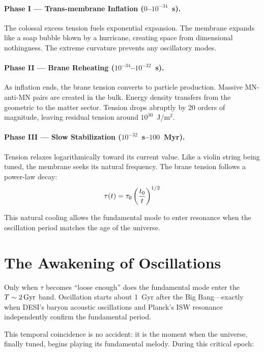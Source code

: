 \paragraph{Phase I --- Trans-membrane Inflation ($0$--$10^{-34}$~s).}
The colossal excess tension fuels exponential expansion. The membrane expands like a soap bubble blown by a hurricane, creating space from dimensional nothingness. The extreme curvature prevents any oscillatory modes.

\paragraph{Phase II --- Brane Reheating ($10^{-34}$--$10^{-32}$~s).}
As inflation ends, the brane tension converts to particle production. Massive MN-anti-MN pairs are created in the bulk. Energy density transfers from the geometric to the matter sector. Tension drops abruptly by 20 orders of magnitude, leaving residual tension around $10^{30}$~J/m$^2$.

\paragraph{Phase III --- Slow Stabilization ($10^{-32}$~s--$100$~Myr).}
Tension relaxes logarithmically toward its current value. Like a violin string being tuned, the membrane seeks its natural frequency. The brane tension follows a power-law decay:
\begin{equation}
\tau(t) = \tau_0 \left(\frac{t_0}{t}\right)^{1/2}
\end{equation}

This natural cooling allows the fundamental mode to enter resonance when the oscillation period matches the age of the universe.

\section{The Awakening of Oscillations}
\label{sec:awakening}

Only when $\tau$ becomes ``loose enough'' does the fundamental mode enter the $T \sim 2\,\text{Gyr}$ band. Oscillation starts about 1~Gyr after the Big Bang---exactly when DESI's baryon acoustic oscillations and Planck's ISW resonance independently confirm the fundamental period.

This temporal coincidence is no accident: it is the moment when the universe, finally tuned, begins playing its fundamental melody. During this critical epoch:

